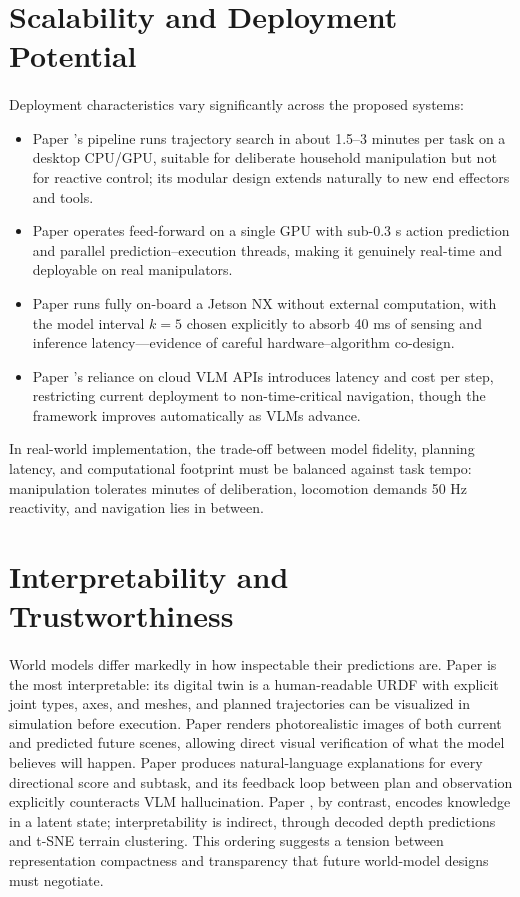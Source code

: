 \documentclass[12pt,a4paper,final]{extreport}
\begin{document}
\section{Scalability and Deployment Potential}

\paragraph{} Deployment characteristics vary significantly across the proposed systems:
\begin{itemize}
  \item Paper \cite{p1}'s pipeline runs trajectory search in about 1.5--3 minutes per task on a desktop CPU/GPU, suitable for deliberate household manipulation but not for reactive control; its modular design extends naturally to new end effectors and tools.
  \item Paper \cite{p2} operates feed-forward on a single GPU with sub-0.3 s action prediction and parallel prediction--execution threads, making it genuinely real-time and deployable on real manipulators.
  \item Paper \cite{p3} runs fully on-board a Jetson NX without external computation, with the model interval $k=5$ chosen explicitly to absorb 40 ms of sensing and inference latency---evidence of careful hardware--algorithm co-design.
  \item Paper \cite{p4}'s reliance on cloud VLM APIs introduces latency and cost per step, restricting current deployment to non-time-critical navigation, though the framework improves automatically as VLMs advance.
\end{itemize}
In real-world implementation, the trade-off between model fidelity, planning latency, and computational footprint must be balanced against task tempo: manipulation tolerates minutes of deliberation, locomotion demands 50 Hz reactivity, and navigation lies in between.

\section{Interpretability and Trustworthiness}

\paragraph{} World models differ markedly in how inspectable their predictions are. Paper \cite{p1} is the most interpretable: its digital twin is a human-readable URDF with explicit joint types, axes, and meshes, and planned trajectories can be visualized in simulation before execution. Paper \cite{p2} renders photorealistic images of both current and predicted future scenes, allowing direct visual verification of what the model believes will happen. Paper \cite{p4} produces natural-language explanations for every directional score and subtask, and its feedback loop between plan and observation explicitly counteracts VLM hallucination. Paper \cite{p3}, by contrast, encodes knowledge in a latent state; interpretability is indirect, through decoded depth predictions and t-SNE terrain clustering. This ordering suggests a tension between representation compactness and transparency that future world-model designs must negotiate.
\end{document}
